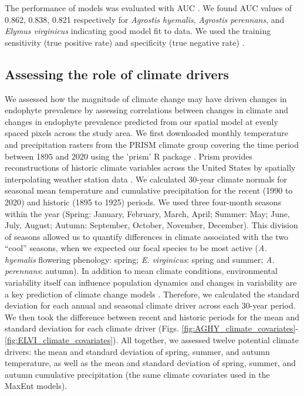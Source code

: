 \documentclass[11pt]{article}
\let\cite\citep
\newcommand{\revise}[1]{{\color{black}{#1}}}
\begin{document}
The performance of models was evaluated with AUC \citep{jimenez2012insights}. 
We found AUC values of 0.862, 0.838, 0.821 respectively  for \emph{Agrostis hyemalis}, \emph{Agrostis perennans}, and \emph{Elymus virginicus} indicating good model fit to data.
We used the training sensitivity (true positive rate) and specificity (true negative rate) \revise{to set a threshold for transforming the continuous predicted probabilities into binary presence - absence host distribution maps on which we projected INLA predictions of endophyte prevalence} \citep{liu2005selecting}.


\subsection*{Assessing the role of climate drivers}
We assessed how the magnitude of climate change may have driven changes in endophyte prevalence by assessing correlations between changes in climate and changes in endophyte prevalence predicted from our spatial model at evenly spaced pixels across the study area.
We first downloaded monthly temperature and precipitation rasters from the PRISM climate group \citep{daly2013prism} covering the time period between 1895 and 2020 using the 'prism' R package \citep{Rprism2015}. 
Prism provides reconstructions of historic climate variables across the United States by spatially interpolating weather station data \citep{diLuzio2008constructing}. 
We calculated 30-year climate normals for seasonal mean temperature and cumulative precipitation for the recent (1990 to 2020) and historic (1895 to 1925) periods.
We used three four-month seasons within the year (Spring: January, February, March, April; Summer: May; June, July, August; Autumn: September, October, November, December). 
This division of seasons allowed us to quantify differences in climate associated with the two ``cool'' seasons, when we expected our focal species to be most active (\emph{A. hyemalis} flowering phenology: spring; \emph{E. virginicus}: spring and summer; \emph{A. perennans}: autumn). 
In addition to mean climate conditions, environmental variability itself can influence population dynamics \cite{tuljapurkar_population_1982} and changes in variability are a key prediction of climate change models \cite{stocker2013technical, ipcc_2021}. 
Therefore, we calculated the standard deviation for each annual and seasonal climate driver across each 30-year period.
We then took the difference between recent and historic periods for the mean and standard deviation for each climate driver (Figs. \ref{fig:AGHY_climate_covariates}-\ref{fig:ELVI_climate_covariates}).
All together, we assessed twelve potential climate drivers: the mean and standard deviation of spring, summer, and autumn temperature, as well as the mean and standard deviation of spring, summer, and autumn cumulative precipitation (the same climate covariates used in the MaxEnt models).
\end{document}
